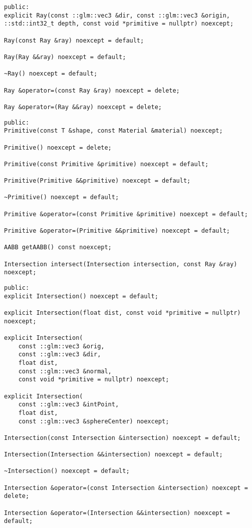\begin{lstlisting}[caption={Ray API}, captionpos=b, label=API_Ray]
public:
explicit Ray(const ::glm::vec3 &dir, const ::glm::vec3 &origin,
::std::int32_t depth, const void *primitive = nullptr) noexcept;

Ray(const Ray &ray) noexcept = default;

Ray(Ray &&ray) noexcept = default;

~Ray() noexcept = default;

Ray &operator=(const Ray &ray) noexcept = delete;

Ray &operator=(Ray &&ray) noexcept = delete;
\end{lstlisting}

\begin{lstlisting}[caption={Primitive API}, captionpos=b, label=API_Primitive]
public:
Primitive(const T &shape, const Material &material) noexcept;

Primitive() noexcept = delete;

Primitive(const Primitive &primitive) noexcept = default;

Primitive(Primitive &&primitive) noexcept = default;

~Primitive() noexcept = default;

Primitive &operator=(const Primitive &primitive) noexcept = default;

Primitive &operator=(Primitive &&primitive) noexcept = default;

AABB getAABB() const noexcept;

Intersection intersect(Intersection intersection, const Ray &ray) noexcept;
\end{lstlisting}

\begin{lstlisting}[caption={Intersection API}, captionpos=b, label=API_Intersection]
public:
explicit Intersection() noexcept = default;

explicit Intersection(float dist, const void *primitive = nullptr) noexcept;

explicit Intersection(
	const ::glm::vec3 &orig,
	const ::glm::vec3 &dir,
	float dist,
	const ::glm::vec3 &normal,
	const void *primitive = nullptr) noexcept;

explicit Intersection(
	const ::glm::vec3 &intPoint,
	float dist,
	const ::glm::vec3 &sphereCenter) noexcept;

Intersection(const Intersection &intersection) noexcept = default;

Intersection(Intersection &&intersection) noexcept = default;

~Intersection() noexcept = default;

Intersection &operator=(const Intersection &intersection) noexcept = delete;

Intersection &operator=(Intersection &&intersection) noexcept = default;
\end{lstlisting}


